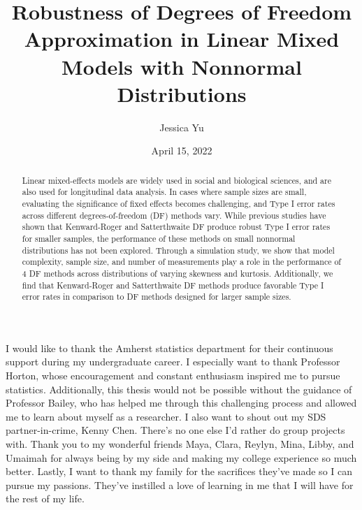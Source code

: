 \documentclass[12pt, twoside]{amherstthesis}
\title{Robustness of Degrees of Freedom Approximation in Linear Mixed Models with Nonnormal Distributions}
\author{Jessica Yu}
\date{April 15, 2022}
\begin{document}
\doublespace
  \maketitle

\frontmatter %
\pagestyle{fancyplain}

  \begin{abstract}
    Linear mixed-effects models are widely used in social and biological sciences, and are also used for longitudinal data analysis. In cases where sample sizes are small, evaluating the significance of fixed effects becomes challenging, and Type I error rates across different degrees-of-freedom (DF) methods vary. While previous studies have shown that Kenward-Roger and Satterthwaite DF produce robust Type I error rates for smaller samples, the performance of these methods on small nonnormal distributions has not been explored. Through a simulation study, we show that model complexity, sample size, and number of measurements play a role in the performance of 4 DF methods across distributions of varying skewness and kurtosis. Additionally, we find that Kenward-Roger and Satterthwaite DF methods produce favorable Type I error rates in comparison to DF methods designed for larger sample sizes.
  \end{abstract}
  \begin{acknowledgments}
    I would like to thank the Amherst statistics department for their continuous support during my undergraduate career. I especially want to thank Professor Horton, whose encouragement and constant enthusiasm inspired me to pursue statistics. Additionally, this thesis would not be possible without the guidance of Professor Bailey, who has helped me through this challenging process and allowed me to learn about myself as a researcher. I also want to shout out my SDS partner-in-crime, Kenny Chen. There's no one else I'd rather do group projects with. Thank you to my wonderful friends Maya, Clara, Reylyn, Mina, Libby, and Umaimah for always being by my side and making my college experience so much better. Lastly, I want to thank my family for the sacrifices they've made so I can pursue my passions. They've instilled a love of learning in me that I will have for the rest of my life.
  \end{acknowledgments}

  \hypersetup{linkcolor=black}
  \setcounter{tocdepth}{2}
  \tableofcontents
\end{document}
